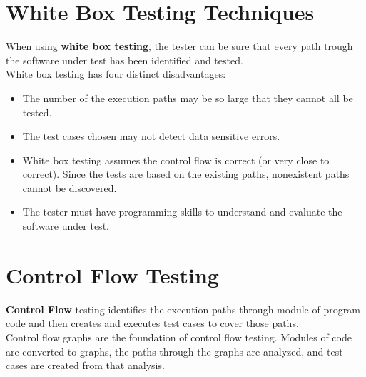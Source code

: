 \documentclass{article}
\begin{document}
\section*{White Box Testing Techniques}
When using \textbf{white box testing}, the tester can be sure that every path trough the software under test has been identified and tested.
\\
White box testing has four distinct disadvantages:
\begin{itemize}
\item The number of the execution paths may be so large that they cannot all be tested.
\item The test cases chosen may not detect data sensitive errors.
\item White box testing assumes the control flow is correct (or very close to correct). Since the tests are based on the existing paths, nonexistent paths cannot be discovered.
\item The tester must have programming skills to understand and evaluate the software under test.
\end{itemize}

\section*{Control Flow Testing}
\textbf{Control Flow} testing identifies the execution paths through module of program code and then creates and executes test cases to cover those paths.
\\
Control flow graphs are the foundation of control flow testing. Modules of code are converted to graphs, the paths through the graphs are analyzed, and test cases are created from that analysis.
\end{document}
